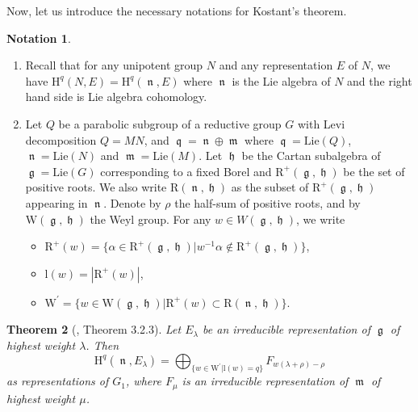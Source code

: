 \documentclass[11pt, a4paper]{amsart}
\theoremstyle{plain}
\newtheorem{theorem}{Theorem}[section]
\theoremstyle{definition}
\newtheorem{notation}[theorem]{Notation}
\numberwithin{equation}{section}
\DeclareMathOperator{\lieg}{\mathfrak g}
\DeclareMathOperator{\lieh}{\mathfrak h}
\DeclareMathOperator{\liem}{\mathfrak m}
\DeclareMathOperator{\lieq}{\mathfrak q}
\DeclareMathOperator{\lien}{\mathfrak n}
\begin{document}
Now, let us introduce the necessary notations for Kostant's theorem. 

\begin{notation}
    \begin{enumerate}
        \item 
        Recall that for any unipotent group $N$ and any representation $E$ of $N$, we have $\mathrm{H}^{q}(N, E) = \mathrm{H}^{q}(\lien, E)$ where $\lien$ is the Lie algebra of $N$ and the right hand side is Lie algebra cohomology. 
        \item Let $Q$ be a parabolic  subgroup of a reductive group $G$ with Levi decomposition $Q = MN$, and $\lieq = \lien \oplus \liem$ where $\lieq = \mathrm{Lie}(Q)$, $\lien = \mathrm{Lie}(N)$ and $\liem = \mathrm{Lie}(M)$. Let $\lieh$ be the Cartan subalgebra of $\lieg = \mathrm{Lie}(G)$ corresponding to a fixed Borel and $\mathrm{R}^{+}(\lieg, \lieh)$ be the set of positive roots. We also write $\mathrm{R}(\lien, \lieh)$ as the subset of $\mathrm{R}^{+}(\lieg, \lieh)$ appearing in $\lien$. Denote by $\rho$ the half-sum of positive roots, and by $\mathrm{W}(\lieg, \lieh)$ the Weyl group. For any $w \in W(\lieg, \lieh)$, we write 
        \begin{itemize}
            \item  $\mathrm{R}^{+}(w) = \{ \alpha \in \mathrm{R}^{+}(\lieg, \lieh) | w^{-1} \alpha \notin \mathrm{R}^{+}(\lieg, \lieh) \}$, 
            \item $\mathrm{l}(w) = |\mathrm{R}^{+}(w)|$,
            \item $\mathrm{W}^{\prime} = \{w \in \mathrm{W}(\lieg, \lieh) | \mathrm{R}^{+}(w) \subset \mathrm{R}(\lien, \lieh) \}$. 
        \end{itemize}
    \end{enumerate}
\end{notation}

\begin{theorem} [\cite{Vogan81}, Theorem 3.2.3]
\label{thm: Kostant_theorem}
    Let $E_{\lambda}$ be an irreducible representation of $\lieg$ of highest weight $\lambda$. Then 
    \begin{equation*}
        \mathrm{H}^{q}(\lien, E_{\lambda}) = \bigoplus_{\{ w \in \mathrm{W}^{'} | \mathrm{l}(w) = q \}} F_{w(\lambda + \rho) - \rho}
    \end{equation*}
    as representations of $G_1$, where $F_{\mu}$ is an irreducible representation of $\liem$ of highest weight $\mu$. 
\end{theorem}
\end{document}
